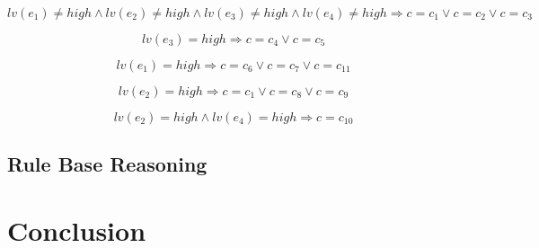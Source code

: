 \begin{equation}
\label{eq:rule1}
	lv(e_1) \neq high \land lv(e_2) \neq high \land lv(e_3) \neq high \land lv(e_4) \neq high \Rightarrow c = c_1 \lor c = c_2 \lor c = c_3
\end{equation}

\begin{equation}
\label{eq:rule2}
	lv(e_3) = high \Rightarrow c = c_4 \lor c = c_5
\end{equation}

\begin{equation}
\label{eq:rule3}
	lv(e_1) = high \Rightarrow c = c_6 \lor c = c_7 \lor c = c_{11}
\end{equation}

\begin{equation}
\label{eq:rule4}
	lv(e_2) = high \Rightarrow c = c_1 \lor c = c_8 \lor c = c_9
\end{equation}

\begin{equation}
\label{eq:rule5}
	lv(e_2) = high \land lv(e_4) = high \Rightarrow c = c_{10}
\end{equation}

\subsection{Rule Base Reasoning}

\section{Conclusion}